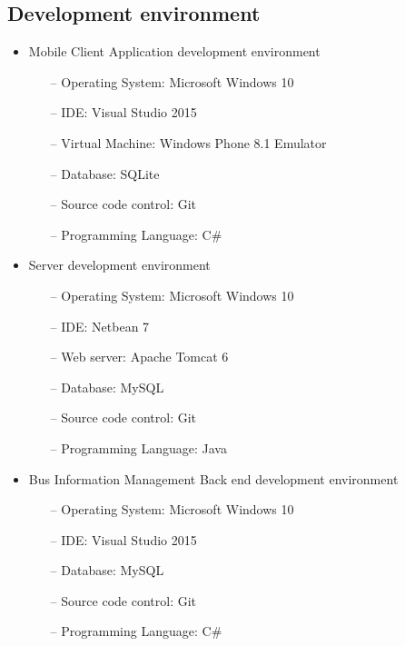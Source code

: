 \subsection{Development environment}
	\begin{itemize}
		\item{Mobile Client Application development environment}
		\begin{itemize}
			\item [--]{Operating System}: Microsoft Windows 10
			\item [--]{IDE}: Visual Studio 2015
			\item [--]{Virtual Machine}: Windows Phone 8.1 Emulator
			\item [--]{Database}: SQLite
			\item [--]{Source code control}: Git
			\item [--]{Programming Language}: C\#
		\end{itemize}
		\item{Server development environment}
		\begin{itemize}
			\item [--]{Operating System}: Microsoft Windows 10
			\item [--]{IDE}: Netbean 7
			\item [--]{Web server}: Apache Tomcat 6
			\item [--]{Database}: MySQL
			\item [--]{Source code control}: Git
			\item [--]{Programming Language}: Java
		\end{itemize}
		\item{Bus Information Management Back end development environment}
		\begin{itemize}
			\item [--]{Operating System}: Microsoft Windows 10
			\item [--]{IDE}: Visual Studio 2015
			\item [--]{Database}: MySQL
			\item [--]{Source code control}: Git
			\item [--]{Programming Language}: C\#
		\end{itemize}
	\end{itemize}
